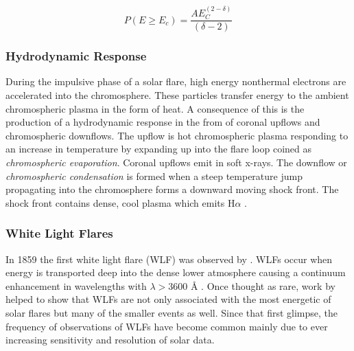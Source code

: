 \begin{equation}\label{pnth1}
P(E \geq E_{c}) = \frac{AE_{C}^{(2-\delta)}}{(\delta - 2)}
\end{equation}

\subsubsection{Hydrodynamic Response}
During the impulsive phase of a solar flare, high energy nonthermal electrons are accelerated into the chromosphere. These particles transfer energy to the ambient chromospheric plasma in the form of heat. A consequence of this is the production of a hydrodynamic response in the from of coronal upflows and chromospheric downflows. The upflow is hot chromospheric plasma responding to an increase in temperature by expanding up into the flare loop coined as \emph{chromospheric evaporation}. Coronal upflows emit in soft x-rays. The downflow or \emph{chromospheric condensation} is formed when a steep temperature jump propagating into the chromosphere forms a downward moving shock front. The shock front contains dense, cool plasma which emits H$\alpha$ \citep{1981SoPh...73..269L, 1990ApJ...348..333C, 2015SoPh..tmp...61K}. 



\subsubsection{White Light Flares}\label{wlf}
In 1859 the first white light flare (WLF) was observed by \cite{1859MNRAS..20...13C}. 
WLFs occur when energy is transported deep into the dense lower atmosphere causing a continuum enhancement in wavelengths with $\lambda > 3600$ Å \citep{1983SoPh...88..275N}. 
Once thought as rare, work by \cite{2003A&A...409.1107M} helped to show that WLFs are not only associated with the most energetic of solar flares but many of the smaller events as well. Since that first glimpse, the frequency of observations of WLFs have become common mainly due to ever increasing sensitivity and resolution of solar data. 


